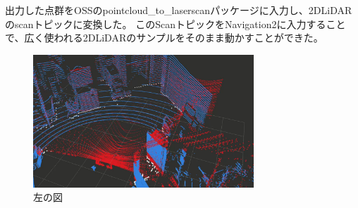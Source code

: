 出力した点群をOSSのpointcloud\_to\_laserscan\cite{laserscan}パッケージに入力し、2DLiDARのscanトピックに変換した。
このScanトピックをNavigation2に入力することで、広く使われる2DLiDARのサンプルをそのまま動かすことができた。

\begin{figure}[bhtp]
    \centering
    \includegraphics[height=5cm]{fig/obstaclescan.png}
    \caption{左の図}
    \label{fig:obstaclescan}
\end{figure}